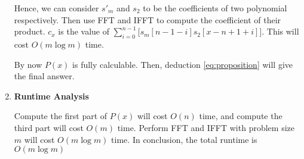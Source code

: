 \documentclass[11pt]{article}
\newenvironment{qparts}{\begin{enumerate}[{(}a{)}]}{\end{enumerate}}
\begin{document}
\begin{qparts}
\begin{enumerate}
		Hence, we can consider $s\prime_m$ and $s_2$ to be the coefficients of two polynomial respectively. Then use FFT  and IFFT to compute the coefficient of their product. $c_x$ is the value of $\sum_{i=0}^{n-1}\bigg [s_m[n-1-i]s_2[x-n+1+i]\bigg]$. This will cost $O(m\log m)$ time.
		
		By now $P(x)$ is fully calculable. Then, deduction \eqref{eq:proposition} will give the final answer.
		

		\item \textbf{Runtime Analysis}
		
		Compute the first part of $P(x)$ will cost $O(n)$ time, and compute the third part will cost $O(m)$ time. Perform FFT and IFFT with problem size $m$ will cost $O(m\log m)$ time. In conclusion, the total runtime is $O(m\log m)$
		
		
		
	\end{enumerate}

\end{qparts}
\end{document}
